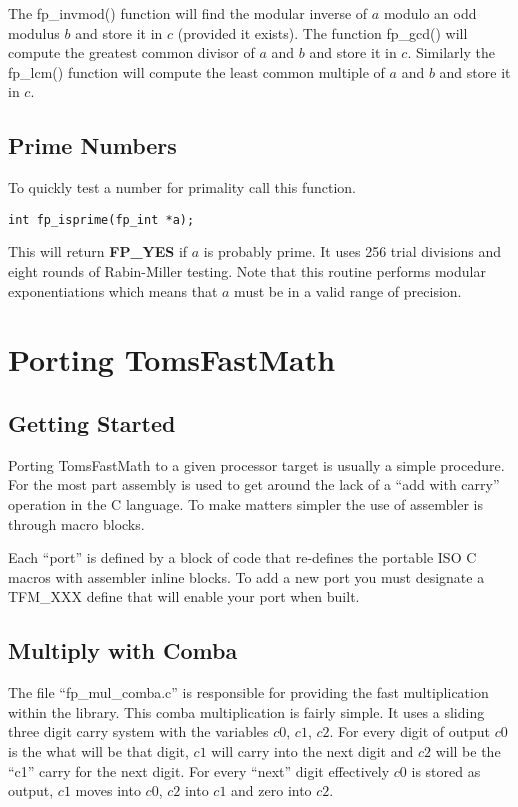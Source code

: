\documentclass[b5paper]{book}
\begin{document}
The fp\_invmod() function will find the modular inverse of $a$ modulo an odd modulus $b$ and store
it in $c$ (provided it exists).  The function fp\_gcd() will compute the greatest common
divisor of $a$ and $b$ and store it in $c$.  Similarly the fp\_lcm() function will compute
the least common multiple of $a$ and $b$ and store it in $c$.

\section{Prime Numbers}
To quickly test a number for primality call this function.

\begin{verbatim}
int fp_isprime(fp_int *a);
\end{verbatim}
This will return \textbf{FP\_YES} if $a$ is probably prime.  It uses 256 trial divisions and
eight rounds of Rabin-Miller testing.  Note that this routine performs modular exponentiations
which means that $a$ must be in a valid range of precision.

\chapter{Porting TomsFastMath}
\label{chap:asmops}
\section{Getting Started}
Porting TomsFastMath to a given processor target is usually a simple procedure.  For the most part 
assembly is used to get around the lack of a ``add with carry'' operation in the C language.  To
make matters simpler the use of assembler is through macro blocks.

Each ``port'' is defined by a block of code that re-defines the portable ISO C macros with assembler
inline blocks.  To add a new port you must designate a TFM\_XXX define that will enable your 
port when built.

\section{Multiply with Comba}
The file ``fp\_mul\_comba.c'' is responsible for providing the fast multiplication within the 
library.  This comba multiplication is fairly simple.  It uses a sliding three digit carry 
system with the variables $c0$, $c1$, $c2$.  For every digit of output $c0$ is the what will
be that digit, $c1$ will carry into the next digit and $c2$ will be the ``c1'' carry for
the next digit.  For every ``next'' digit effectively $c0$ is stored as output, $c1$ moves into
$c0$, $c2$ into $c1$ and zero into $c2$.
\end{document}

